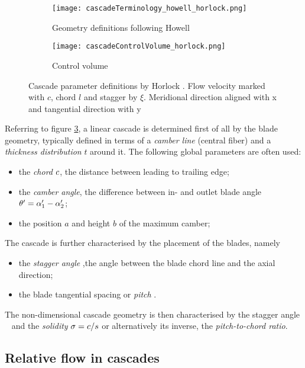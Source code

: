 \begin{figure}[!h]
  \centering
  \begin{subfigure}{0.44\textwidth}
    \texttt{[image: cascadeTerminology\_howell\_horlock.png]}
    \caption{Geometry definitions following Howell}
    \label{fig:cascadeGeometry}
  \end{subfigure}
  \begin{subfigure}{0.55\textwidth}
    \texttt{[image: cascadeControlVolume\_horlock.png]}
    \caption{Control volume}
    \label{fig:cascadeControlVolume}
  \end{subfigure}
  \caption{Cascade parameter definitions by Horlock \cite{Horlock}.
    Flow velocity marked with $c$, chord $l$ and stagger by
    $\xi$. Meridional direction aligned with x and tangential direction with y}
  \label{fig:cascadeDefinition}
\end{figure} 
Referring to figure \ref{fig:cascadeDefinition}, a linear cascade is
determined first of all by the blade geometry, typically defined in
terms of a \emph{camber line} (central fiber) and a \emph{thickness
  distribution} $t$ around it. The following global parameters are
often used:
\begin{itemize}
\item the \emph{chord} $c$, \ie the distance between leading to
  trailing edge;
\item the \emph{camber angle}, \ie the difference between in- and
  outlet blade angle $\theta^\prime = \alpha^\prime_1 - \alpha^\prime_2$;
\item the position $a$ and height $b$ of the maximum camber;
\end{itemize}
The cascade is further characterised by the placement of the blades,
namely
\begin{itemize}
\item the \emph{stagger angle} \stagger,\ie the angle between the
  blade chord line and the axial direction;
\item the blade tangential spacing or \emph{pitch} \pitch.
\end{itemize}
The non-dimensional cascade geometry is then characterised by the
stagger angle \stagger~ and the \emph{solidity} $\sigma =
c/s$ or alternatively its inverse, the \emph{pitch-to-chord
  ratio}.  

\subsection{Relative flow in cascades}
\label{sec:cascadeStationary}

